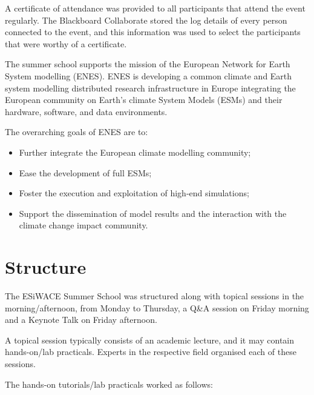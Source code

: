 A certificate of attendance was provided to all participants that attend the event regularly. The Blackboard Collaborate stored the log details of every person connected to the event, and this information was used to select the participants that were worthy of a certificate.

The summer school supports the mission of the European Network for Earth System modelling (ENES). ENES is developing a common climate and Earth system modelling distributed research infrastructure in Europe integrating the European community on Earth's climate System Models (ESMs) and their hardware, software, and data environments.

The overarching goals of ENES are to:

\begin{itemize}

\item Further integrate the European climate modelling community;

\item Ease the development of full ESMs;

\item Foster the execution and exploitation of high‐end simulations;

\item Support the dissemination of model results and the interaction with the climate change impact community.

\end{itemize}

\section{Structure}

The ESiWACE Summer School was structured along with topical sessions in the morning/afternoon, from Monday to Thursday, a Q\&A session on Friday morning and a Keynote Talk on Friday afternoon.

A topical session typically consists of an academic lecture, and it may contain hands-on/lab practicals. Experts in the respective field organised each of these sessions.

The hands-on tutorials/lab practicals worked as follows:

